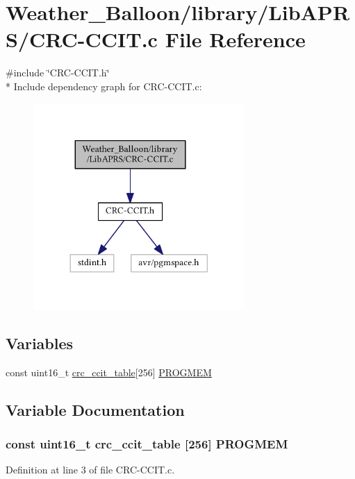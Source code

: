 \hypertarget{_c_r_c-_c_c_i_t_8c}{}\section{Weather\+\_\+\+Balloon/library/\+Lib\+A\+P\+R\+S/\+C\+R\+C-\/\+C\+C\+IT.c File Reference}
\label{_c_r_c-_c_c_i_t_8c}
{\ttfamily \#include \char`\"{}C\+R\+C-\/\+C\+C\+I\+T.\+h\char`\"{}}\\*
Include dependency graph for C\+R\+C-\/\+C\+C\+IT.c\+:
\nopagebreak
\begin{figure}[H]
\begin{center}
\leavevmode
\includegraphics[width=228pt]{_c_r_c-_c_c_i_t_8c__incl}
\end{center}
\end{figure}
\subsection*{Variables}
\begin{DoxyCompactItemize}
\item 
const uint16\+\_\+t \hyperlink{_c_r_c-_c_c_i_t_8h_aada4617cdcf1f888402be21cb0e7215d}{crc\+\_\+ccit\+\_\+table}\mbox{[}256\mbox{]} \hyperlink{_c_r_c-_c_c_i_t_8c_ae8f4cb61567bac19e74cc21717eaa048}{P\+R\+O\+G\+M\+EM}
\end{DoxyCompactItemize}


\subsection{Variable Documentation}
\subsubsection[{\texorpdfstring{P\+R\+O\+G\+M\+EM}{PROGMEM}}]{\setlength{\rightskip}{0pt plus 5cm}const uint16\+\_\+t {\bf crc\+\_\+ccit\+\_\+table} \mbox{[}256\mbox{]} P\+R\+O\+G\+M\+EM}\hypertarget{_c_r_c-_c_c_i_t_8c_ae8f4cb61567bac19e74cc21717eaa048}{}\label{_c_r_c-_c_c_i_t_8c_ae8f4cb61567bac19e74cc21717eaa048}


Definition at line 3 of file C\+R\+C-\/\+C\+C\+I\+T.\+c.

